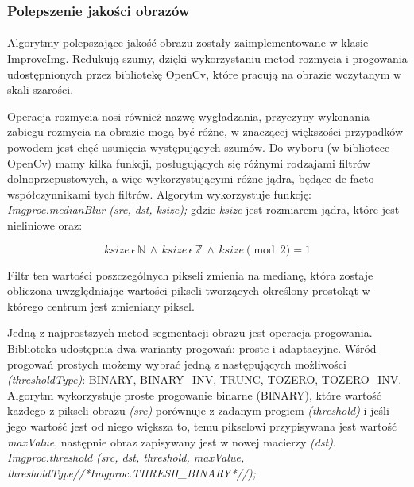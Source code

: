 \documentclass[a4paper,12pt]{article}
\begin{document}
		\subsubsection{Polepszenie jakości obrazów}
			\paragraph{\indent} Algorytmy polepszające jakość obrazu zostały zaimplementowane w klasie           ImproveImg. Redukują szumy, dzięki wykorzystaniu metod rozmycia i        progowania udostępnionych przez bibliotekę OpenCv, które pracują na         obrazie wczytanym w skali szarości.  
			\par
			    Operacja rozmycia nosi również nazwę wygładzania, przyczyny wykonania zabiegu rozmycia na obrazie mogą być różne, w znaczącej większości przypadków powodem jest chęć usunięcia występujących szumów. Do wyboru (w bibliotece OpenCv) mamy kilka funkcji, posługujących się różnymi rodzajami filtrów dolnoprzepustowych, a więc wykorzystującymi różne jądra, będące de facto współczynnikami tych filtrów. Algorytm wykorzystuje funkcję:
			    \textit{Imgproc.medianBlur (src, dst, ksize);}
			    gdzie \textit{ksize} jest rozmiarem jądra, które jest nieliniowe oraz:  
			    
			    \begin{displaymath}
                    ksize\, \epsilon\, \mathbb{N}\, \wedge\, ksize\, \epsilon\, \mathbb{Z}\, \wedge\, ksize\pmod{2} = 1
                \end{displaymath}
                
                \par Filtr ten wartości poszczególnych pikseli zmienia na medianę, która zostaje obliczona uwzględniając wartości pikseli tworzących określony prostokąt w którego centrum jest zmieniany piksel. 
                
                \par
			    Jedną z najprostszych metod segmentacji obrazu jest operacja progowania.  Biblioteka udostępnia dwa warianty progowań: proste i adaptacyjne. 
			    Wśród progowań prostych możemy wybrać jedną z następujących możliwości  \textit{(thresholdType)}: BINARY, BINARY\_INV, TRUNC, TOZERO, TOZERO\_INV.
			    Algorytm wykorzystuje proste progowanie binarne (BINARY), które wartość każdego z pikseli obrazu \textit{(src)} porównuje z zadanym progiem \textit{(threshold)} i jeśli jego wartość jest od niego większa to, temu pikselowi przypisywana jest wartość \textit{maxValue}, następnie obraz zapisywany jest w nowej macierzy \textit{(dst)}.\\
			    \textit{Imgproc.threshold (src, dst, threshold, maxValue, thresholdType//*Imgproc.THRESH\_BINARY*//);}
			    
\end{document}
